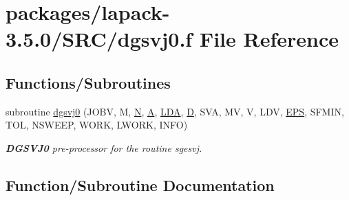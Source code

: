 \hypertarget{dgsvj0_8f}{}\section{packages/lapack-\/3.5.0/\+S\+R\+C/dgsvj0.f File Reference}
\label{dgsvj0_8f}
\subsection*{Functions/\+Subroutines}
\begin{DoxyCompactItemize}
\item 
subroutine \hyperlink{dgsvj0_8f_a8f7c26f84438f90cd00775033ebec3a8}{dgsvj0} (J\+O\+B\+V, M, \hyperlink{polmisc_8c_a0240ac851181b84ac374872dc5434ee4}{N}, \hyperlink{classA}{A}, \hyperlink{example__user_8c_ae946da542ce0db94dced19b2ecefd1aa}{L\+D\+A}, \hyperlink{odrpack_8h_a7dae6ea403d00f3687f24a874e67d139}{D}, S\+V\+A, M\+V, V, L\+D\+V, \hyperlink{tukey_8c_a6ebf6899d6c1c8b7b9d09be872c05aae}{E\+P\+S}, S\+F\+M\+I\+N, T\+O\+L, N\+S\+W\+E\+E\+P, W\+O\+R\+K, L\+W\+O\+R\+K, I\+N\+F\+O)
\begin{DoxyCompactList}\small\item\em {\bfseries D\+G\+S\+V\+J0} pre-\/processor for the routine sgesvj. \end{DoxyCompactList}\end{DoxyCompactItemize}


\subsection{Function/\+Subroutine Documentation}
\hypertarget{dgsvj0_8f_a8f7c26f84438f90cd00775033ebec3a8}{}
